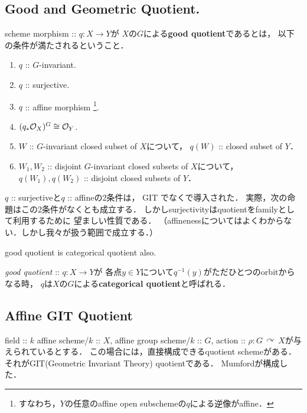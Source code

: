 \documentclass[a4paper]{jsarticle}
\newcommand{\acton}{\,\curvearrowright\,}
\begin{document}
    \subsection{Good and Geometric Quotient.}
    \begin{Def}
        scheme morphism :: $q: X \to Y$が
        $X$の$G$による\textbf{good quotient}であるとは，
        以下の条件が満たされるということ．
        \begin{enumerate}[label=(\roman*), leftmargin=*]
        \item $q$ :: $G$-invariant.
        \item $q$ :: surjective.
        \item $q$ :: affine morphism
              \footnote{ すなわち，$Y$の任意のaffine open subschemeの$q$による逆像がaffine． }.
        \item $(q_*\mathcal{O}_X)^G \cong \mathcal{O}_Y$.
        \item
            $W$ :: $G$-invariant closed subset of $X$について，
            $q(W)$ :: closed subset of $Y$．
        \item
            $W_1, W_2$ :: disjoint $G$-invariant closed subsets of $X$について，
            $q(W_1), q(W_2)$ :: disjoint closed subsets of $Y$．
    \end{enumerate}
    \end{Def}
    $q$ :: surjectiveと$q$ :: affineの2条件は，
    GIT \cite{GIT}でなく\cite{Ses}で導入された．
    実際，次の命題はこの2条件がなくとも成立する．
    しかしsurjectivityはquotientをfamilyとして利用するために
    望ましい性質である．
    （affinenessについてはよくわからない．しかし我々が扱う範囲で成立する．）

    \begin{Prop}
        good quotient is categorical quotient also.
    \end{Prop}

    \begin{Def}
        \textit{good quotient} :: $q: X \to Y$が
        各点$y \in Y$について$q^{-1}(y)$がただひとつのorbitからなる時，
        $q$は$X$の$G$による\textbf{categorical quotient}と呼ばれる．
    \end{Def}


    \subsection{Affine GIT Quotient}
    field :: $k$
    affine scheme/$k$ :: $X$,
    affine group scheme/$k$ :: $G$,
    action :: $\rho: G \acton X$が与えられているとする．
    この場合には，直接構成できるquotient schemeがある．
    それがGIT(Geometric Invariant Theory) quotientである．
    Mumfordが構成した．
    
\end{document}
